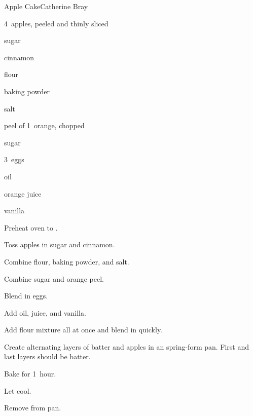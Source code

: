 \begin{recipe}{Apple Cake}{Catherine Bray}{}

\begin{ingredients}
\item 4~apples, peeled and thinly sliced
\item \C{\third} sugar
\item {} cinnamon
\item {} flour
\item {} baking powder
\item \tp{\quarter} salt
\item peel of 1~orange, chopped
\item \C{1\half} sugar
\item 3~eggs
\item \C{\twothird} oil
\item {} orange juice
\item {} vanilla
\end{ingredients}

\begin{directions}
\item Preheat oven to .
\item Toss apples in \C{\third} sugar and cinnamon.
\item Combine flour, baking powder, and salt.
\item Combine \C{1\half} sugar and orange peel.
\item Blend in eggs.
\item Add oil, juice, and vanilla.
\item Add flour mixture all at once and blend in quickly.
\item Create alternating layers of batter and apples in an  spring-form pan. First and last layers should be batter.
\item Bake for 1~hour.
\item Let cool.
\item Remove from pan.
\end{directions}

\end{recipe}
